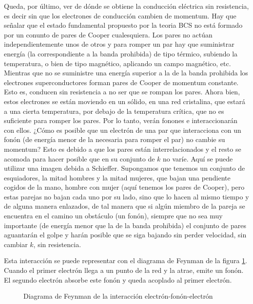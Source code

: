 Queda, por último, ver de dónde se obtiene la conducción eléctrica sin resistencia, es decir sin que los electrones de conducción cambien de momentum. Hay que señalar que el estado fundamental propuesto por la teoria BCS no está formado por un conunto de pares de Cooper cualesquiera. Los pares no actúan independientemente unos de otros y para romper un par hay que suministrar energía (la correspondiente a la banda prohibida) de tipo térmico, subiendo la temperatura, o bien de tipo magnético, aplicando un campo magnético, etc. Mientras que no se suministre una energía superior a la de la banda prohibida los electrones superconductores forman pares de Cooper de momentum constante. Esto es, conducen sin resistencia a no ser que se rompan los pares. Ahora bien, estos electrones se están moviendo en un sólido, en una red cristalina, que estará a una cierta temperatura, por debajo de la temperatura crítica, que no es suficiente para romper los pares. Por lo tanto, verán fonones e interaccionarán con ellos. ¿Cómo es posible que un electrón de una par que interacciona con un fonón (de energía menor de la necesaria para romper el par) no cambie su momentum? Esto es debido a que los pares están interrelacionados y el resto se acomoda para hacer posible que en su conjunto de $k$ no varíe. Aquí se puede utilizar una imagen debida a Schieffer. Supongamos que tenemos un conjunto de esquiadores, la mitad hombres y la mitad mujeres, que bajan una pendiente cogidos de la mano, hombre con mujer (aquí tenemos los pares de Cooper), pero estas parejas no bajan cada uno por su lado, sino que lo hacen al mismo tiempo y de alguna manera enlazados, de tal manera que si algún miembro de la pareja se encuentra en el camino un obstáculo (un fonón), siempre que no sea muy importante (de energía menor que la de la banda prohibida) el conjunto de pares aguantarán el golpe y harán posible que se siga bajando sin perder velocidad, sin cambiar $k$, sin resistencia.

Esta interacción se puede representar con el diagrama de Feynman de la figura \ref{fig:feynmanefe}. Cuando el primer electrón llega a un punto de la red y la atrae, emite un fonón. El segundo electrón absorbe este fonón y queda acoplado al primer electrón.

\begin{figure}[H]
    \center
    \caption{Diagrama de Feynman de la interacción electrón-fonón-electrón}
    \label{fig:feynmanefe}
\end{figure}

